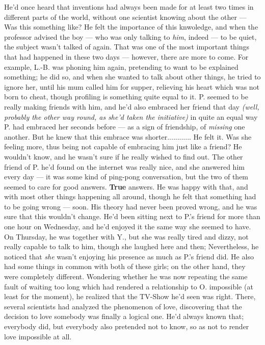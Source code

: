 He'd once heard that inventions had always been made for at least two times in different parts of the world, without one scientist knowing about the other --- Was this something like?
He felt the importance of this knwoledge, and when the professor advised the boy --- who was only talking to \emph{him}, indeed --- to be quiet, the subject wasn't talked of again. 
That was one of the most important things that had happened in these two days --- however, there are more to come. 
For example, L.-B. was phoning him again, pretending to want to be explained something; he did so, and when she wanted to talk about other things, he tried to ignore her, until his mum called him for supper, relieving his heart which was not born to cheat, though profiling is something quite equal to it. 
P. seemed to be really making friends with him, and he'd also embraced her friend that day \emph{(well, probably the other way round, as she'd taken the initiative)} in quite an equal way P. had embraced her seconds before --- as a sign of friendship, of \emph{missing} one another. But he knew that this embrace was shorter............
He felt it. Was she feeling more, thus being not capable of embracing him just like a friend?
He wouldn't know, and he wasn't sure if he really wished to find out. 
The other friend of P. he'd found on the internet was really nice, and she answered him every day --- it was some kind of ping-pong conversation, but the two of them seemed to care for good answers. 
\textbf{True} answers. 
He was happy with that, and with most other things happening all around, though he felt that something had to be going wrong --- soon. His theory had never been proved wrong, and he was sure that this wouldn't change. 
He'd been sitting next to P.'s friend for more than one hour on Wednesday, and he'd enjoyed it the same way she seemed to have. On Thursday, he was together with Y., but she was really tired and dizzy, not really capable to talk to him, though she laughed here and then; Nevertheless, he noticed that \emph{she} wasn't enjoying his presence as much as P.'s friend did. 
He also had some things in common with both of these girls; on the other hand, they were completely different. 
Wondering whether he was now repeating the same fault of waiting too long which had rendered a relationship to O. impossible (at least for the moment), he realized that the TV-Show he'd seen was right. 
There, several scientists had analyzed the phenomenon of love, discovering that the decision to love somebody was finally a logical one. 
He'd always known that; everybody did, but everybody also pretended not to know, so as not to render love impossible at all. 
